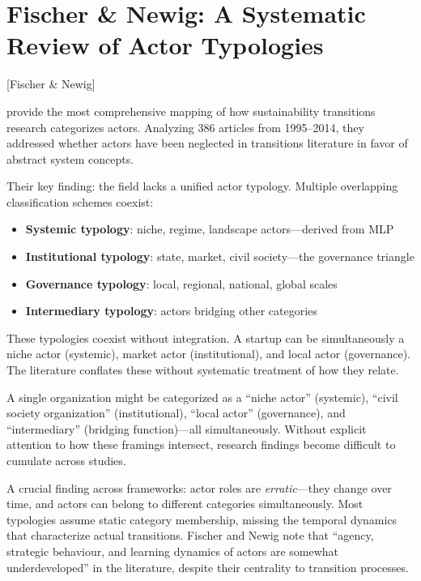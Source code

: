 \documentclass[../main.tex]{subfiles}
\begin{document}
\section{Fischer \& Newig: A Systematic Review of Actor Typologies}[Fischer \& Newig]

\textcite{fischernewig2016actors} provide the most comprehensive mapping of how sustainability transitions research categorizes actors. Analyzing 386 articles from 1995--2014, they addressed whether actors have been neglected in transitions literature in favor of abstract system concepts.

Their key finding: the field lacks a unified actor typology. Multiple overlapping classification schemes coexist:

\begin{itemize}[nosep]
\item \textbf{Systemic typology}: niche, regime, landscape actors---derived from MLP
\item \textbf{Institutional typology}: state, market, civil society---the governance triangle
\item \textbf{Governance typology}: local, regional, national, global scales
\item \textbf{Intermediary typology}: actors bridging other categories
\end{itemize}

These typologies coexist without integration. A startup can be simultaneously a niche actor (systemic), market actor (institutional), and local actor (governance). The literature conflates these without systematic treatment of how they relate.

\begin{insightbox}
A single organization might be categorized as a ``niche actor'' (systemic), ``civil society organization'' (institutional), ``local actor'' (governance), and ``intermediary'' (bridging function)---all simultaneously. Without explicit attention to how these framings intersect, research findings become difficult to cumulate across studies.
\end{insightbox}

A crucial finding across frameworks: actor roles are \textit{erratic}---they change over time, and actors can belong to different categories simultaneously. Most typologies assume static category membership, missing the temporal dynamics that characterize actual transitions. Fischer and Newig note that ``agency, strategic behaviour, and learning dynamics of actors are somewhat underdeveloped'' in the literature, despite their centrality to transition processes.
\end{document}
